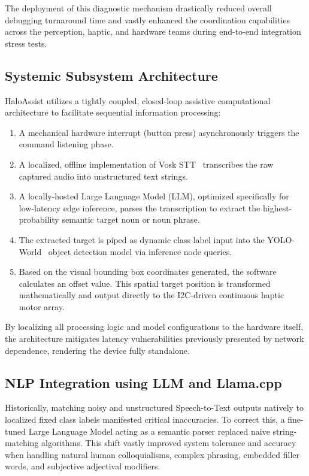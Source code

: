 \documentclass{article}
\begin{document}
The deployment of this diagnostic mechanism drastically reduced overall debugging turnaround time and vastly enhanced the coordination capabilities across the perception, haptic, and hardware teams during end-to-end integration stress tests.

\subsection{Systemic Subsystem Architecture}

HaloAssist utilizes a tightly coupled, closed-loop assistive computational architecture to facilitate sequential information processing:
\begin{enumerate}
    \item A mechanical hardware interrupt (button press) asynchronously triggers the command listening phase.
    \item A localized, offline implementation of Vosk STT~\cite{alphacep_vosk} transcribes the raw captured audio into unstructured text strings.
    \item A locally-hosted Large Language Model (LLM), optimized specifically for low-latency edge inference, parses the transcription to extract the highest-probability semantic target noun or noun phrase.
    \item The extracted target is piped as dynamic class label input into the YOLO-World~\cite{cheng2024yoloworld} object detection model via inference node queries.
    \item Based on the visual bounding box coordinates generated, the software calculates an offset value. This spatial target position is transformed mathematically and output directly to the I2C-driven continuous haptic motor array.
\end{enumerate}

By localizing all processing logic and model configurations to the hardware itself, the architecture mitigates latency vulnerabilities previously presented by network dependence, rendering the device fully standalone.

\subsection{NLP Integration using LLM and Llama.cpp}

Historically, matching noisy and unstructured Speech-to-Text outputs natively to localized fixed class labels manifested critical inaccuracies. To correct this, a fine-tuned Large Language Model acting as a semantic parser replaced naive string-matching algorithms. This shift vastly improved system tolerance and accuracy when handling natural human colloquialisms, complex phrasing, embedded filler words, and subjective adjectival modifiers.
\end{document}
